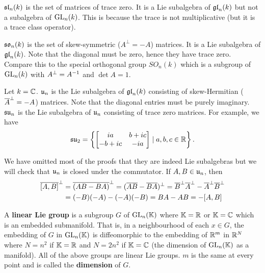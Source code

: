 \begin{exam}
  $\operatorname{\mathfrak{sl}}_n(k)$ is the set of matrices of trace zero.
  It is a Lie subalgebra of $\operatorname{\mathfrak{gl}}_n(k)$ but not a subalgebra of $\operatorname{GL}_n(k)$.
  This is because the trace is not multiplicative (but it is a trace class operator).
\end{exam}

\begin{exam}
  \lv
  \begin{enum}
    \io
    $\mathfrak{so}_n(k)$ is the set of skew-symmetric ($A^\perp=-A$) matrices.
    It is a Lie subalgebra of $\operatorname{\mathfrak{gl}}_n(k)$.
    Note that the diagonal must be zero, hence they have trace zero.
    Compare this to the special orthogonal group $SO_n(k)$ which is a subgroup of $\operatorname{GL}_n(k)$ with $A^\perp=A^{-1}$ and $\det A=1$.

    \io
    Let $k=\mathbb{C}$.
    $\mathfrak{u}_n$ is the Lie subalgebra of $\operatorname{\mathfrak{gl}}_n(k)$ consisting of skew-Hermitian ($\overline A^\perp=-A$) matrices.
    Note that the diagonal entries must be purely imaginary.
    $\mathfrak{su}_n$ is the Lie subalgebra of $\mathfrak{u}_n$ consisting of trace zero matrices.
    For example, we have
    \[ \mathfrak{su}_2 = \left\{ 
	\begin{bmatrix}
	  ia & b+ic \\ -b+ic & -ia
	\end{bmatrix}
	\mid a,b,c \in \mathbb{R}
    \right\}. \]
  \end{enum}

  We have omitted most of the proofs that they are indeed Lie subalgebras but we will check that $\mathfrak{u}_n$ is closed under the commutator.
  If $A,B \in \mathfrak{u}_n$, then
  \begin{align*}
    \overline{[A,B]}^\perp &= \overline{(AB-BA)}^\perp = (\overline A \overline B - \overline B \overline A)^\perp = \overline B^\perp \overline A^\perp - \overline A^\perp \overline B^\perp \\
    &= (-B)(-A)-(-A)(-B) = BA-AB = -[A,B]
  \end{align*}
\end{exam}

\begin{defn}
  A \textbf{linear Lie group} is a subgroup $G$ of $\operatorname{GL}_n(\mathbb{K})$ where $\mathbb{K}=\mathbb{R}$ or $\mathbb{K}=\mathbb{C}$ which is an embedded submanifold.
  That is, in a neighbourhood of each $x \in G$, the embedding of $G$ in $\operatorname{GL}_n(\mathbb{K})$ is diffeomorphic to the embedding of $\mathbb{R}^m$ in $\mathbb{R}^N$ where $N=n^2$ if $\mathbb{K}=\mathbb{R}$ and $N=2n^2$ if $\mathbb{K}=\mathbb{C}$ (the dimension of $\operatorname{GL}_n(\mathbb{K})$ as a manifold).
  All of the above groups are linear Lie groups.
  $m$ is the same at every point and is called the \textbf{dimension} of $G$.
\end{defn}


